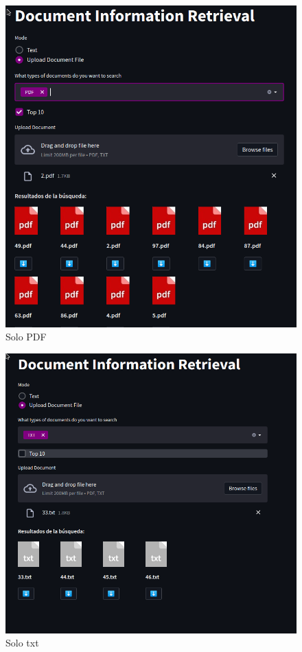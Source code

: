 \documentclass{llncs}
\begin{document}
\begin{figure}
    \caption{Solo PDF}
    \includegraphics[scale = .28]{./images/only_pdf.png}
\end{figure}

\begin{figure}
    \caption{Solo txt}
    \includegraphics[scale = .28]{./images/onlytxt.png}
\end{figure}
\end{document}
